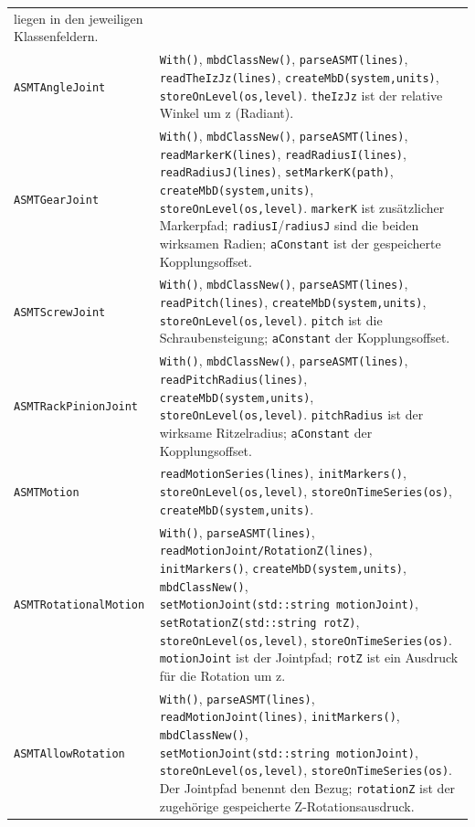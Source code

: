\documentclass[
  12pt
]{book}
\begin{document}
\begin{longtable}[]{@{}
  >{\raggedright\arraybackslash}p{}
  >{\raggedright\arraybackslash}p{}@{}}
liegen in den jeweiligen Klassenfeldern. \\
\texttt{ASMTAngleJoint} & \texttt{With()}, \texttt{mbdClassNew()},
\texttt{parseASMT(lines)}, \texttt{readTheIzJz(lines)},
\texttt{createMbD(system,units)}, \texttt{storeOnLevel(os,level)}.
\texttt{theIzJz} ist der relative Winkel um z (Radiant). \\
\texttt{ASMTGearJoint} & \texttt{With()}, \texttt{mbdClassNew()},
\texttt{parseASMT(lines)}, \texttt{readMarkerK(lines)},
\texttt{readRadiusI(lines)}, \texttt{readRadiusJ(lines)},
\texttt{setMarkerK(path)}, \texttt{createMbD(system,units)},
\texttt{storeOnLevel(os,level)}. \texttt{markerK} ist zusätzlicher
Markerpfad; \texttt{radiusI}/\texttt{radiusJ} sind die beiden wirksamen
Radien; \texttt{aConstant} ist der gespeicherte Kopplungsoffset. \\
\texttt{ASMTScrewJoint} & \texttt{With()}, \texttt{mbdClassNew()},
\texttt{parseASMT(lines)}, \texttt{readPitch(lines)},
\texttt{createMbD(system,units)}, \texttt{storeOnLevel(os,level)}.
\texttt{pitch} ist die Schraubensteigung; \texttt{aConstant} der
Kopplungsoffset. \\
\texttt{ASMTRackPinionJoint} & \texttt{With()}, \texttt{mbdClassNew()},
\texttt{parseASMT(lines)}, \texttt{readPitchRadius(lines)},
\texttt{createMbD(system,units)}, \texttt{storeOnLevel(os,level)}.
\texttt{pitchRadius} ist der wirksame Ritzelradius; \texttt{aConstant}
der Kopplungsoffset. \\
\texttt{ASMTMotion} & \texttt{readMotionSeries(lines)},
\texttt{initMarkers()}, \texttt{storeOnLevel(os,level)},
\texttt{storeOnTimeSeries(os)}, \texttt{createMbD(system,units)}. \\
\texttt{ASMTRotationalMotion} & \texttt{With()},
\texttt{parseASMT(lines)}, \texttt{readMotionJoint/RotationZ(lines)},
\texttt{initMarkers()}, \texttt{createMbD(system,units)},
\texttt{mbdClassNew()},
\texttt{setMotionJoint(std::string\ motionJoint)},
\texttt{setRotationZ(std::string\ rotZ)},
\texttt{storeOnLevel(os,level)}, \texttt{storeOnTimeSeries(os)}.
\texttt{motionJoint} ist der Jointpfad; \texttt{rotZ} ist ein Ausdruck
für die Rotation um z. \\
\texttt{ASMTAllowRotation} & \texttt{With()}, \texttt{parseASMT(lines)},
\texttt{readMotionJoint(lines)}, \texttt{initMarkers()},
\texttt{mbdClassNew()},
\texttt{setMotionJoint(std::string\ motionJoint)},
\texttt{storeOnLevel(os,level)}, \texttt{storeOnTimeSeries(os)}. Der
Jointpfad benennt den Bezug; \texttt{rotationZ} ist der zugehörige
gespeicherte Z-Rotationsausdruck. \\

\end{longtable}
\end{document}
